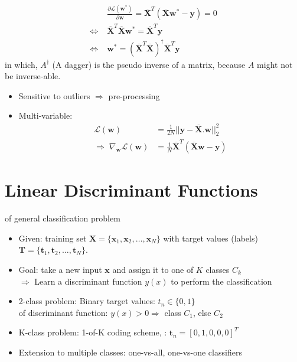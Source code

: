 \begin{align}
	&\frac{\partial\mathcal{L}(\textbf{w}^*)}{\partial\textbf{w}} = \overline{\textbf{X}}^T \left( \overline{\textbf{X}} \textbf{w}^* - \textbf{y} \right) = 0 \\
	\Leftrightarrow \; &\overline{\textbf{X}}^T\overline{\textbf{X}}\textbf{w}^* = \overline{\textbf{X}}^T \textbf{y} \\
	\Leftrightarrow \; &\textbf{w}^* = \left( \overline{\textbf{X}}^T \overline{\textbf{X}} \right)^\dagger \overline{\textbf{X}}^T \textbf{y}
\end{align}
in which, $A^\dagger$ (A dagger) is the pseudo inverse of a matrix, because $A$ might not be inverse-able. {\color{red} }

\note
\begin{itemize}
	\item Sensitive to outliers $\Rightarrow$ pre-processing
	\item Multi-variable:
	\begin{align*}
		\mathcal{L}(\textbf{w}) &= \frac{1}{2N} ||\textbf{y}-\overline{\textbf{X}}.\textbf{w}||^2_2 \\
		\Rightarrow\; \nabla_\textbf{w}\mathcal{L}(\textbf{w}) &= \frac{1}{N} \overline{\textbf{X}}^T (\overline{\textbf{X}}\textbf{w}-\textbf{y})
	\end{align*}
\end{itemize}

\section{Linear Discriminant Functions}
\label{sec:linear-classification}
 of general classification problem
\begin{itemize}
	\item Given: training set $\textbf{X} = \{\textbf{x}_1, \textbf{x}_2, \dots, \textbf{x}_N\}$ with target values (labels) $\textbf{T} = \{\textbf{t}_1, \textbf{t}_2, \dots, \textbf{t}_N\}$.
	\item Goal: take a new input $\textbf{x}$ and assign it to one of $K$ classes $C_k$\\
	$\Rightarrow$ Learn a discriminant function $y(x)$ to perform the classification
\end{itemize}
\begin{itemize}
	\item 2-class problem: Binary target values: $t_n \in \{0, 1\}$\\
	\Eg of discriminant function: $y(x) > 0 \Rightarrow$ class $C_1$, else $C_2$
	\item K-class problem: 1-of-K coding scheme, \eg: $\textbf{t}_n = [0, 1, 0, 0, 0]^T$
	\item Extension to multiple classes: one-vs-all, one-vs-one classifiers
\end{itemize}

